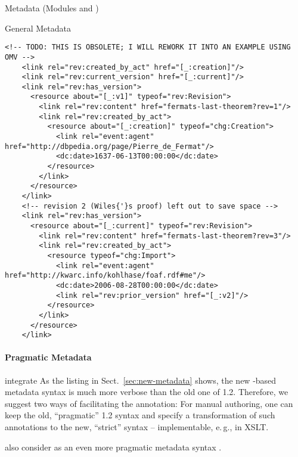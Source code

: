 \begin{tchapter}[id=metadata,short=Metadata]{Metadata (Modules {} and  {})}
\begin{tsection}{General Metadata}
\begin{lstlisting}[language={[1.6]OMDoc},escapeinside={\{\}}]
    <!-- TODO: THIS IS OBSOLETE; I WILL REWORK IT INTO AN EXAMPLE USING OMV -->
    <link rel="rev:created_by_act" href="[_:creation]"/>
    <link rel="rev:current_version" href="[_:current]"/>
    <link rel="rev:has_version">
      <resource about="[_:v1]" typeof="rev:Revision">
        <link rel="rev:content" href="fermats-last-theorem?rev=1"/>
        <link rel="rev:created_by_act">
          <resource about="[_:creation]" typeof="chg:Creation">
            <link rel="event:agent" href="http://dbpedia.org/page/Pierre_de_Fermat"/>
            <dc:date>1637-06-13T00:00:00</dc:date>
          </resource>
        </link>
      </resource>
    </link>
    <!-- revision 2 (Wiles{'}s proof) left out to save space -->
    <link rel="rev:has_version">
      <resource about="[_:current]" typeof="rev:Revision">
        <link rel="rev:content" href="fermats-last-theorem?rev=3"/>
        <link rel="rev:created_by_act">
          <resource typeof="chg:Import">
            <link rel="event:agent" href="http://kwarc.info/kohlhase/foaf.rdf#me"/>
            <dc:date>2006-08-28T00:00:00</dc:date>
            <link rel="rev:prior_version" href="[_:v2]"/>
          </resource>
        </link>
      </resource>
    </link>
\end{lstlisting}

\paragraph{Pragmatic Metadata}
\label{sec:new-metadata-pragmatic}


\begin{oldpart}{integrate}
  As the listing in Sect.~\ref{sec:new-metadata} shows, the new
  \rdfa-based metadata   syntax is much more verbose than the old one
  of {\omdoc} 1.2.  Therefore, we suggest   two ways of facilitating
  the annotation: For manual authoring, one can keep the old,
  \enquote{pragmatic} {\omdoc} 1.2 syntax and specify a transformation
  of such annotations to   the new, \enquote{strict} \rdfa syntax --
  implementable, e.\,g., in XSLT.
\end{oldpart}

also consider {\sTeX} as an even more pragmatic metadata syntax .


\end{tsection}
\end{tchapter}
